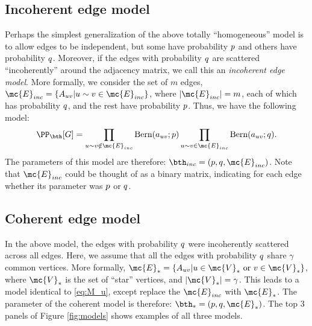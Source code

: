 
\subsection{Incoherent edge model} %
\label{ssub:incoherent_subspace}

Perhaps the simplest generalization of the above totally ``homogeneous'' model is to allow edges to be independent, but some have probability $p$ and others have probability $q$.  Moreover, if the edges with probability $q$ are scattered ``incoherently'' around the adjacency matrix, we call this an \emph{incoherent edge model}. More formally, we consider the set of $m$ edges, $\mc{E}_{inc}=\{A_{uv} | u \sim v \in \mc{E}_{inc}\}$, where $|\mc{E}_{inc}|=m$, each of which has probability $q$, and the rest have probability $p$.  Thus, we have the following model:
\begin{equation} \label{eq:M_u}
	\PP_{\bth}[G] = \prod_{u \sim v \notin \mc{E}_{inc}} \text{Bern}(a_{uv}; p) \prod_{u \sim v \in \mc{E}_{inc}} \text{Bern}(a_{uv}; \qq).
\end{equation}
The parameters of this model are therefore: $\bth_{inc}=(p,\qq,\mc{E}_{inc})$. Note that $\mc{E}_{inc}$ could be thought of as a binary matrix, indicating for each edge whether its parameter was $p$ or $q$.




\subsection{Coherent edge model} %
\label{ssub:incoherent_subspace}

In the above model, the edges with probability $q$ were incoherently scattered across all edges.  Here, we assume that all the edges with probability $q$ share $\gamma$ common vertices.  More formally, $\mc{E}_*=\{A_{uv} | u \in \mc{V}_* \text{ or } v \in \mc{V}_*\}$, where $\mc{V}_*$ is the set of ``star'' vertices, and $|\mc{V}_*|=\gamma$.  This leads to a model identical to \eqref{eq:M_u}, except replace the $\mc{E}_{inc}$ with $\mc{E}_*$. The parameter of the coherent model is therefore: $\bth_{*}=(p,\qq,\mc{E}_*)$.  The top 3 panels of Figure \ref{fig:models} shows examples of all three models.


